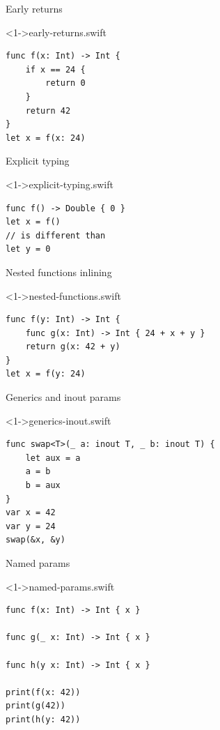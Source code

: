 \documentclass[hyperref={pdfpagelabels=false},xcolor={dvipsnames},compress,table,usenames,dvipsnames]{beamer}
\begin{document}
    \begin{frame}[fragile]{Early returns}
        \begin{exampleblock}
            <1->{early-returns.swift}
            \begin{lstlisting}
func f(x: Int) -> Int {
    if x == 24 {
        return 0
    }
    return 42
}
let x = f(x: 24)
            \end{lstlisting}
        \end{exampleblock}
    \end{frame}

    \begin{frame}[fragile]{Explicit typing}
        \begin{exampleblock}
            <1->{explicit-typing.swift}
            \begin{lstlisting}
func f() -> Double { 0 }
let x = f()  
// is different than 
let y = 0
            \end{lstlisting}
        \end{exampleblock}
    \end{frame}

    \begin{frame}[fragile]{Nested functions inlining}
        \begin{exampleblock}
            <1->{nested-functions.swift}
            \begin{lstlisting}
func f(y: Int) -> Int {
    func g(x: Int) -> Int { 24 + x + y }
    return g(x: 42 + y)
}
let x = f(y: 24)
            \end{lstlisting}
        \end{exampleblock}
    \end{frame}

    \begin{frame}[fragile]{Generics and inout params}
        \begin{exampleblock}
            <1->{generics-inout.swift}
            \begin{lstlisting}
func swap<T>(_ a: inout T, _ b: inout T) {
    let aux = a
    a = b
    b = aux
}
var x = 42
var y = 24
swap(&x, &y)
            \end{lstlisting}
        \end{exampleblock}
    \end{frame}

    \begin{frame}[fragile]{Named params}
        \begin{exampleblock}
            <1->{named-params.swift}
            \begin{lstlisting}
func f(x: Int) -> Int { x }

func g(_ x: Int) -> Int { x }

func h(y x: Int) -> Int { x }

print(f(x: 42))
print(g(42))
print(h(y: 42))
            \end{lstlisting}
        \end{exampleblock}
    \end{frame}
\end{document}
